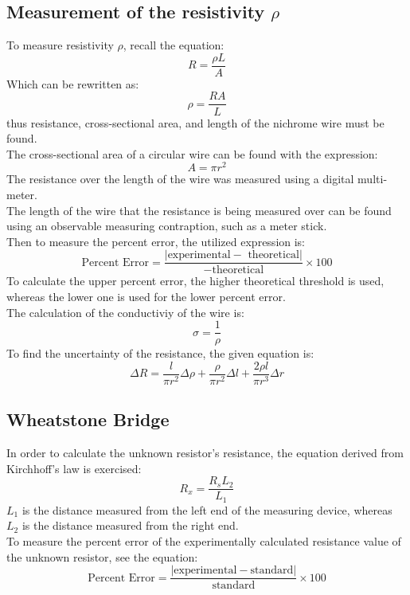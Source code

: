 \documentclass[titlepage]{article}
\begin{document}
	\subsection{Measurement of the resistivity $\rho$}
	To measure resistivity $\rho$, recall the equation:
	$$R = \frac{\rho L}{A}$$
	Which can be rewritten as:
	$$\rho = \frac{RA}{L}$$
	thus resistance, cross-sectional area, and length of the nichrome wire must be found. \\
	\vspace{0.5cm}
	The cross-sectional area of a circular wire can be found with the expression:
	$$A = \pi r^{2}$$
	\vspace{0.5cm}
	The resistance over the length of the wire was measured using a digital multi-meter.\\
	\vspace{0.05cm}
	The length of the wire that the resistance is being measured over can be found using an observable measuring contraption, such as a meter stick.\\
	\vspace{0.5cm}
	Then to measure the percent error, the utilized expression is:
	$$\text{Percent Error} = \frac{|\text{experimental} -\text{ theoretical}|}{-\text{theoretical}} \times 100$$
	To calculate the upper percent error, the higher theoretical threshold is used, whereas the lower one is used for the lower percent error.\\
	The calculation of the conductiviy of the wire is:
	$$\sigma = \frac{1}{\rho}$$
	To find the uncertainty of the resistance, the given equation is:
	$$\Delta R = \frac{l}{\pi r^{2}} \Delta \rho + \frac{\rho}{\pi r^{2}} \Delta l + \frac{2 \rho l}{\pi r^{3}} \Delta r$$
	\subsection{Wheatstone Bridge}
In order to calculate the unknown resistor's resistance, the equation derived from Kirchhoff's law is exercised:
$$R_{x} = \frac{R_{s} L_{2}}{L_{1}}$$	
$L_{1}$ is the distance measured from the left end of the measuring device, whereas $L_{2}$ is the distance measured from the right end.\\
To measure the percent error of the experimentally calculated resistance value of the unknown resistor, see the equation:
	$$\text{Percent Error} = \frac{|\text{experimental} -\text{standard}|}{\text{standard}} \times 100$$
\end{document}
